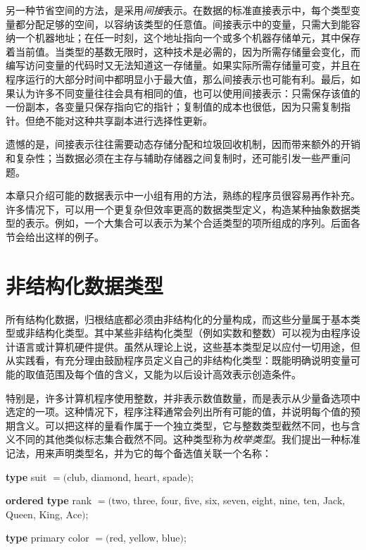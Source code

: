 \documentclass[twoside,11pt,fontset=none]{ctexbook}
\begin{document}
另一种节省空间的方法，是采用\textit{间接}表示。在数据的标准直接表示中，每个类型变量都分配足够的空间，以容纳该类型的任意值。间接表示中的变量，只需大到能容纳一个机器地址；在任一时刻，这个地址指向一个或多个机器存储单元，其中保存着当前值。当类型的基数无限时，这种技术是必需的，因为所需存储量会变化，而编写访问变量的代码时又无法知道这一存储量。如果实际所需存储量可变，并且在程序运行的大部分时间中都明显小于最大值，那么间接表示也可能有利。最后，如果认为许多不同变量往往会具有相同的值，也可以使用间接表示：只需保存该值的一份副本，各变量只保存指向它的指针；复制值的成本也很低，因为只需复制指针。但绝不能对这种共享副本进行选择性更新。

遗憾的是，间接表示往往需要动态存储分配和垃圾回收机制，因而带来额外的开销和复杂性；当数据必须在主存与辅助存储器之间复制时，还可能引发一些严重问题。

本章只介绍可能的数据表示中一小组有用的方法，熟练的程序员很容易再作补充。许多情况下，可以用一个更复杂但效率更高的数据类型定义，构造某种抽象数据类型的表示。例如，一个大集合可以表示为某个合适类型的项所组成的序列。后面各节会给出这样的例子。
\section[非结构化数据类型]{非结构化数据类型}
\label{sec:unstructured-data-types}

所有结构化数据，归根结底都必须由非结构化的分量构成，而这些分量属于基本类型或非结构化类型。其中某些非结构化类型（例如实数和整数）可以视为由程序设计语言或计算机硬件提供。虽然从理论上说，这些基本类型足以应付一切用途，但从实践看，有充分理由鼓励程序员定义自己的非结构化类型：既能明确说明变量可能的取值范围及每个值的含义，又能为以后设计高效表示创造条件。

特别是，许多计算机程序使用整数，并非表示数值数量，而是表示从少量备选项中选定的一项。这种情况下，程序注释通常会列出所有可能的值，并说明每个值的预期含义。可以把这样的量看作属于一个独立类型，它与整数类型截然不同，也与含义不同的其他类似标志集合截然不同。这种类型称为\textit{枚举类型}。我们提出一种标准记法，用来声明类型名，并为它的每个备选值关联一个名称：
\medskip

\tabto{3.7em}\textbf{type} suit $= ($club, diamond, heart, spade$)$;

\noindent
{}\parindent\textbf{ordered} \tabto{3.7em}\textbf{type} rank $= ($two, three, four, five, six, seven, eight, nine, ten, Jack, Queen, King, Ace$)$;
\medskip

\tabto{3.7em}\textbf{type} primary color $= ($red, yellow, blue$)$;
\end{document}

